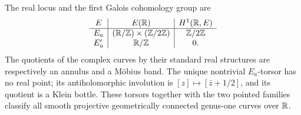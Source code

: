\begin{theorem}\label{A7-real-topology}
The real locus and the first Galois cohomology group are
\[
 \begin{array}{c|c|c}
 E & E({\mathbb{R}}) & H^1({\mathbb{R}},E)\\\hline
 E_a & ({\mathbb{R}}/{\mathbb{Z}})\times({\mathbb{Z}}/2{\mathbb{Z}}) & {\mathbb{Z}}/2{\mathbb{Z}}\\
 E'_a & {\mathbb{R}}/{\mathbb{Z}} & 0.
 \end{array}
\]
The quotients of the complex curves by their standard real structures are respectively an annulus and a M\"obius band. The unique nontrivial $E_a$-torsor has no real point; its antiholomorphic involution is $[z]\mapsto[\bar{z}+1/2]$, and its quotient is a Klein bottle. These torsors together with the two pointed families classify all smooth projective geometrically connected genus-one curves over ${\mathbb{R}}$.
\end{theorem}
